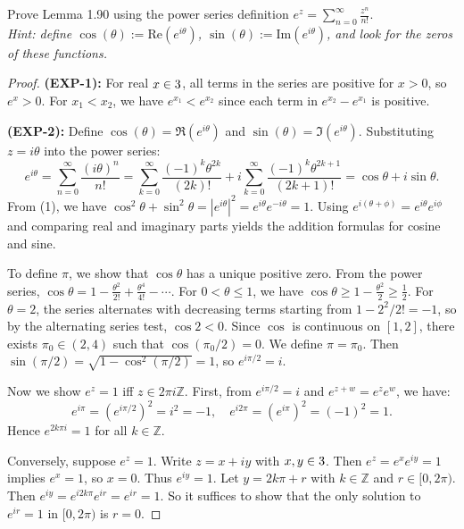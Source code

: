 \documentclass{article}
\begin{document}
Prove Lemma 1.90 using the power series definition
$e^z = \sum_{n=0}^{\infty} \frac{z^n}{n!}$. \\
\textit{Hint: define $\cos(\theta) := \text{Re}(e^{i\theta})$,
  $\sin(\theta) := \text{Im}(e^{i\theta})$, and look for the zeros of
these functions.}

\begin{proof}
  \textbf{(EXP-1):} For real $x \in 3$, all terms in the series are
  positive for $x > 0$, so $e^x > 0$. For $x_1 < x_2$, we have
  $e^{x_1} < e^{x_2}$ since each term in $e^{x_2} - e^{x_1}$ is positive.

  \textbf{(EXP-2):} Define $\cos(\theta) = \Re(e^{i\theta})$ and
  $\sin(\theta) = \Im(e^{i\theta})$. Substituting $z = i\theta$ into the
  power series:
  \[
    e^{i\theta} = \sum_{n=0}^{\infty} \frac{(i\theta)^n}{n!}
    = \sum_{k=0}^{\infty} \frac{(-1)^k \theta^{2k}}{(2k)!}
    + i \sum_{k=0}^{\infty} \frac{(-1)^k \theta^{2k+1}}{(2k+1)!}
    = \cos\theta + i\sin\theta.
    \tag{1}
  \]
  From (1), we have $\cos^2\theta + \sin^2\theta = |e^{i\theta}|^2
  = e^{i\theta}e^{-i\theta} = 1$. Using $e^{i(\theta+\phi)} =
  e^{i\theta}e^{i\phi}$ and comparing real and imaginary parts yields
  the addition formulas for cosine and sine.

  To define $\pi$, we show that $\cos\theta$ has a unique positive zero.
  From the power series, $\cos\theta = 1 - \frac{\theta^2}{2!} +
  \frac{\theta^4}{4!} - \cdots$.
  For $0 < \theta \le 1$, we have $\cos\theta \ge 1 -
  \frac{\theta^2}{2} \ge \frac{1}{2}$.
  For $\theta = 2$, the series alternates with decreasing terms starting
  from $1 - 2^2/2! = -1$, so by the alternating series test, $\cos 2 < 0$.
  Since $\cos$ is continuous on $[1, 2]$, there exists
  $\pi_0 \in (2, 4)$ such that $\cos(\pi_0/2) = 0$. We define $\pi = \pi_0$.
  Then $\sin(\pi/2) = \sqrt{1 - \cos^2(\pi/2)} = 1$, so $e^{i\pi/2} = i$.

  Now we show $e^z = 1$ iff $z \in 2\pi i\mathbb{Z}$. First, from
  $e^{i\pi/2} = i$
  and $e^{z+w} = e^z e^w$, we have:
  \[
    e^{i\pi} = (e^{i\pi/2})^2 = i^2 = -1, \quad
    e^{i2\pi} = (e^{i\pi})^2 = (-1)^2 = 1.
  \]
  Hence $e^{2k\pi i} = 1$ for all $k \in \mathbb{Z}$.

  Conversely, suppose $e^z = 1$. Write $z = x + iy$ with $x, y \in 3$.
  Then $e^z = e^x e^{iy} = 1$ implies $e^x = 1$, so $x = 0$. Thus $e^{iy} = 1$.
  Let $y = 2k\pi + r$ with $k \in \mathbb{Z}$ and $r \in [0, 2\pi)$. Then
  $e^{iy} = e^{i2k\pi} e^{ir} = e^{ir} = 1$. So it suffices to show that
  the only solution to $e^{ir} = 1$ in $[0, 2\pi)$ is $r = 0$.


\end{proof}
\end{document}
